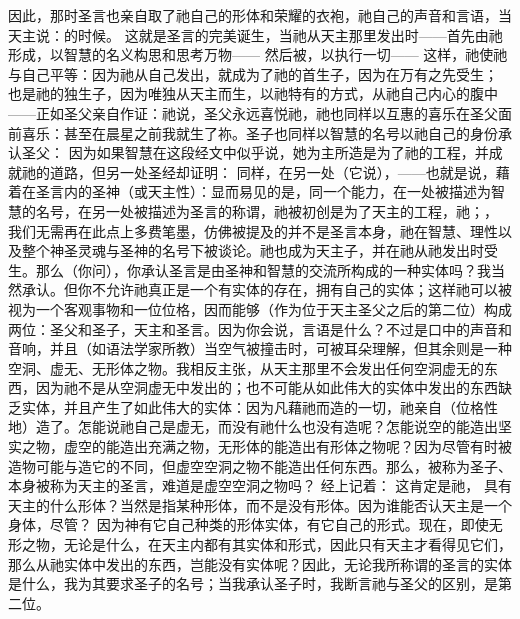因此，那时圣言也亲自取了祂自己的形体和荣耀的衣袍，祂自己的声音和言语，当天主说：的时候。 这就是圣言的完美诞生，当祂从天主那里发出时——首先由祂形成，以智慧的名义构思和思考万物—— 然后被，以执行一切—— 这样，祂使祂与自己平等：因为祂从自己发出，就成为了祂的首生子，因为在万有之先受生； 也是祂的独生子，因为唯独从天主而生，以祂特有的方式，从祂自己内心的腹中——正如圣父亲自作证：祂说，圣父永远喜悦祂，祂也同样以互惠的喜乐在圣父面前喜乐：甚至在晨星之前我就生了祢。圣子也同样以智慧的名号以祂自己的身份承认圣父： 因为如果智慧在这段经文中似乎说，她为主所造是为了祂的工程，并成就祂的道路，但另一处圣经却证明： 同样，在另一处（它说），——也就是说，藉着在圣言内的圣神（或天主性）：显而易见的是，同一个能力，在一处被描述为智慧的名号，在另一处被描述为圣言的称谓，祂被初创是为了天主的工程，祂；， 我们无需再在此点上多费笔墨，仿佛被提及的并不是圣言本身，祂在智慧、理性以及整个神圣灵魂与圣神的名号下被谈论。祂也成为天主子，并在祂从祂发出时受生。那么（你问），你承认圣言是由圣神和智慧的交流所构成的一种实体吗？我当然承认。但你不允许祂真正是一个有实体的存在，拥有自己的实体；这样祂可以被视为一个客观事物和一位位格，因而能够（作为位于天主圣父之后的第二位）构成两位：圣父和圣子，天主和圣言。因为你会说，言语是什么？不过是口中的声音和音响，并且（如语法学家所教）当空气被撞击时，可被耳朵理解，但其余则是一种空洞、虚无、无形体之物。我相反主张，从天主那里不会发出任何空洞虚无的东西，因为祂不是从空洞虚无中发出的；也不可能从如此伟大的实体中发出的东西缺乏实体，并且产生了如此伟大的实体：因为凡藉祂而造的一切，祂亲自（位格性地）造了。怎能说祂自己是虚无，而没有祂什么也没有造呢？怎能说空的能造出坚实之物，虚空的能造出充满之物，无形体的能造出有形体之物呢？因为尽管有时被造物可能与造它的不同，但虚空空洞之物不能造出任何东西。那么，被称为圣子、本身被称为天主的圣言，难道是虚空空洞之物吗？ 经上记着： 这肯定是祂， 具有天主的什么形体？当然是指某种形体，而不是没有形体。因为谁能否认天主是一个身体，尽管？ 因为神有它自己种类的形体实体，有它自己的形式。现在，即使无形之物，无论是什么，在天主内都有其实体和形式，因此只有天主才看得见它们，那么从祂实体中发出的东西，岂能没有实体呢？因此，无论我所称谓的圣言的实体是什么，我为其要求圣子的名号；当我承认圣子时，我断言祂与圣父的区别，是第二位。\par

